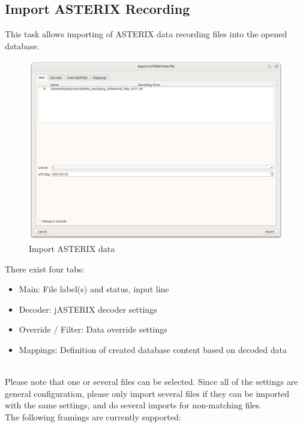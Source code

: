 \subsection{Import ASTERIX Recording}
\label{sec:ui_import_asterix}

This task allows importing of ASTERIX data recording files into the opened database. \\

\begin{figure}[H]
  \center
    \hspace*{-0.5cm}
    \includegraphics[width=17cm]{figures/asterix_import_data.png}
  \caption{Import ASTERIX data}
\end{figure}

There exist four tabs:

\begin{itemize}
\item Main: File label(s) and status, input line
\item Decoder: jASTERIX decoder settings
\item Override / Filter: Data override settings
\item Mappings: Definition of created database content based on decoded data
\end{itemize}
\ \\

Please note that one or several files can be selected. Since all of the settings are general configuration, please only import several files if they can be imported with the same settings, and do several imports for non-matching files. \\

The following framings are currently supported:

